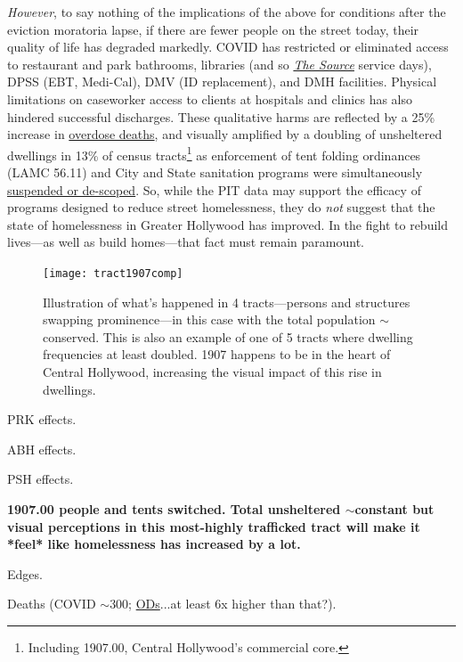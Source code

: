 \documentclass[11pt,twocolumn]{article}
\def\bfr{\bf\color{red}}
\begin{document}
{\it However}, to say nothing of the implications of the above for conditions after the eviction moratoria
lapse, if there are fewer people on the street today, their quality of life has degraded markedly. COVID has restricted or 
eliminated access to restaurant and park bathrooms, libraries (and so 
\href{https://www.lapl.org/homeless-resources/the-source}{\it The Source} service days), DPSS 
(EBT, Medi-Cal), DMV (ID replacement), and DMH facilities. Physical limitations on caseworker 
access to clients at hospitals and clinics has also hindered successful discharges. These qualitative harms are reflected 
by a 25\% increase in 
\href{https://www.latimes.com/california/story/2021-01-07/the-powerful-synthetic-opioid-fentanyl-is-behind-rising-deaths-in-the-homeless-population}{overdose deaths}, and visually amplified by a doubling of unsheltered dwellings in 13\% of census 
tracts\footnote{Including 1907.00, Central Hollywood's commercial core.} as enforcement of tent folding ordinances
(LAMC 56.11) and City and State sanitation programs were simultaneously 
\href{https://clkrep.lacity.org/onlinedocs/2020/20-0147_misc_3-17-20_p.pdf}{suspended or de-scoped}. 
So, while the PIT data may support the efficacy of programs designed to reduce street 
homelessness, they do {\it not} suggest that the state of homelessness in Greater Hollywood has improved. In the 
fight to rebuild lives---as well as build homes---that fact must remain paramount.

\begin{figure}[]
	\centering
	\texttt{[image: tract1907comp]}
	\caption{Illustration of what's happened in 4 tracts---persons and structures
			swapping prominence---in this case with the total population
			$\sim$conserved. This is also an example of one of 5 tracts where
			dwelling frequencies at least doubled. 1907 happens to be in the 
			heart of Central Hollywood, increasing the visual impact of this
			rise in dwellings.}
	\label{fig:1907}
\end{figure}

PRK effects.

ABH effects.

PSH effects.

{\bfr 1907.00 people and tents switched. Total unsheltered $\sim$constant but visual perceptions
in this most-highly trafficked tract will make it *feel* like homelessness has increased by a lot.}


Edges.

Deaths (COVID $\sim$300; \href{http://publichealth.lacounty.gov/phcommon/public/media/mediapubhpdetail.cfm?prid=2900#:~:text=LOS\%20ANGELES\%20\%E2\%80\%93The\%20Los\%20Angeles,deaths\%20among\%20people\%20experiencing\%20homelessness.}{ODs}...at least 6x higher
than that?).
\end{document}
